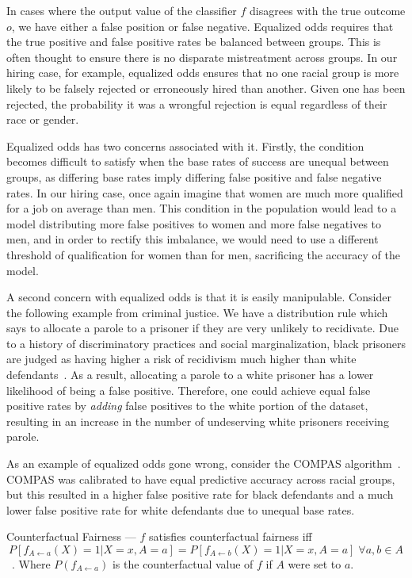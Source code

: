 In cases where the output value of the classifier $f$ disagrees with the true
outcome $o$, we have either a false position or false negative. 
Equalized odds requires that the true positive and false positive rates be
balanced between groups. This is often thought to ensure there is no disparate 
mistreatment across groups. In our hiring case, for example, equalized odds
ensures that no one racial group is more likely to be falsely rejected or
erroneously hired than another. Given one has been rejected, the probability it
was a wrongful rejection is equal regardless of their race or gender.

Equalized odds has two concerns associated with it. Firstly, the condition
becomes difficult to satisfy when the base rates of success are unequal between
groups, as differing base rates imply differing false positive and false
negative rates. In our hiring case, once again imagine that women are much more
qualified for a job on average than men. This condition in the population
would lead to a model distributing more false positives to women and more false
negatives to men, and in order to rectify this imbalance, we would need to use
a different threshold of qualification for women than for men, sacrificing the
accuracy of the model.

A second concern with equalized odds is that it is easily manipulable. Consider
the following example from criminal justice. We have a distribution rule which
says to allocate a parole to a prisoner if they are very unlikely to recidivate.
Due to a history of discriminatory practices and social marginalization, black
prisoners are judged as having higher a risk of recidivism much higher than
white defendants~\citep{CrimeJustice_2023}. As a result, allocating a parole to 
a white prisoner has a lower likelihood of being a false positive. Therefore,
one could achieve equal false positive rates by \textit{adding} false
positives to the white portion of the dataset, resulting in an increase in the
number of undeserving white prisoners receiving parole.

As an example of equalized odds gone wrong, consider the COMPAS
algorithm~\citep{Angwin_2016}. COMPAS was calibrated to have equal predictive
accuracy across racial groups, but this resulted in a higher false positive rate
for black defendants and a much lower false positive rate for white defendants
due to unequal base rates.

\begin{definition}
    Counterfactual Fairness — $f$ satisfies counterfactual fairness iff
    \[P[f_{A \leftarrow a}(X) = 1 | X = x, A = a] = P[f_{A\leftarrow b}(X) = 1 |
         X = x, A = a]\;\forall a, b \in A\]~\citep{Kusner_2018}.
    Where $P(f_{A \leftarrow a})$ is the counterfactual value of $f$ if $A$ were
    set to $a$.
\end{definition}

